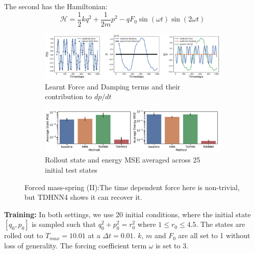 \documentclass{article}
\begin{document}
The second has the Hamiltonian:
\begin{equation}
\mathcal{H} = \frac{1}{2}kq^2 + \frac{1}{2m}p^2 - qF_0\sin(\omega t)\sin(2\omega t)
\end{equation}
\begin{figure}[h!]
\centering
\captionsetup{justification=centering}
	\begin{subfigure}[b]{0.48\textwidth}
		\centering
		\includegraphics[width=\textwidth]{figures/figures/forced_mass_spring/2/forced_mass_spring_dpdt_0.pdf}
		\caption{Learnt Force and Damping terms and their contribution to $dp/dt$}
	\end{subfigure}
	\begin{subfigure}[b]{0.48\textwidth}
	    \centering
		\includegraphics[width=\textwidth]{figures/figures/forced_mass_spring/2/forced_mass_spring_errors_0.pdf}
		\caption{Rollout state and energy MSE averaged across 25 initial test states}
	\end{subfigure}
\caption{Forced mass-spring (II):The time dependent force here is non-trivial, but TDHNN4 shows it can recover it.}
\label{fig.fmspring2}
\end{figure}
\textbf{Training:} In both settings, we use 20 initial conditions, where the initial state $[q_0,p_0]$ is sampled such that $q_0^2 +p_0^2 =r_0^2$ where $1 \leq r_0 \leq 4.5$. The states are rolled out to $T_{max}=10.01$ at a $\Delta t = 0.01$. $k$, $m$ and $F_0$ are all set to 1 without loss of generality. The forcing coefficient term $\omega$ is set to 3. 
\end{document}
